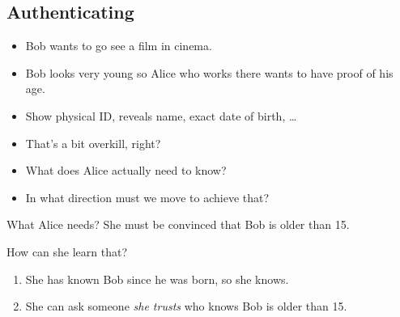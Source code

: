 \subsection{Authenticating}

\begin{frame}
  \begin{example}
    \begin{itemize}
      \item Bob wants to go see a film in cinema.
      \item Bob looks very young so Alice who works there wants to have proof 
        of his age.

        \pause

      \item Show physical ID, reveals name, exact date of birth, \dots
    \end{itemize}
  \end{example}

  \pause

  \begin{exercise}
    \begin{itemize}
      \item That's a bit overkill, right?
      \item What does Alice actually need to know?
      \item In what direction must we move to achieve that?
    \end{itemize}
  \end{exercise}
\end{frame}

\begin{frame}
  \begin{block}{What Alice needs?}
    She must be convinced that Bob is older than 15.
  \end{block}

  \pause

  \begin{alertblock}{How can she learn that?}
    \begin{enumerate}
      \item She has known Bob since he was born, so she knows.

        \pause

      \item She can ask someone \emph{she trusts} who knows Bob is older than 
        15.
    \end{enumerate}
  \end{alertblock}
\end{frame}

